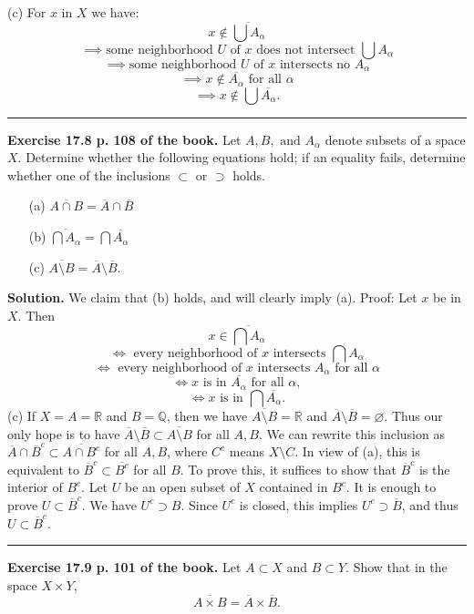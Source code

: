 \documentclass[12pt,letterpaper]{article}
\newcommand{\hs}{\bigskip\hrule\medskip}
\newcommand{\noi}{\noindent}%
\newcommand{\Q}{\mathbb Q}%
\newcommand{\sm}{\setminus}
\newcommand{\R}{\mathbb R}
\begin{document}
\noi(c) For $x$ in $X$ we have: 
$$
x\notin\overline{\bigcup A_\alpha}
$$ 
$$
\implies\text{some neighborhood $U$ of $x$ does not intersect }\bigcup A_\alpha
$$ 
$$
\implies\text{some neighborhood $U$ of $x$ intersects no }A_\alpha
$$ 
$$
\implies x\notin\overline{A_\alpha}\text{ for all }\alpha
$$ 
$$
\implies x\notin\bigcup\overline{A_\alpha}.
$$ 

\hs 

\noi\textbf{Exercise 17.8 p. 108 of the book.} Let $A, B, \text{ and } A_\alpha$ denote subsets of a space $X$. Determine whether the following equations hold; if an equality fails, determine whether one of the inclusions $\subset$ or $\supset$ holds.
\begin{enumerate}%
\item[(a)] $\overline{A \cap B}= \overline{A} \cap \overline{B}$
\item[(b)] $\overline{\bigcap A_\alpha}=\bigcap\overline{A_\alpha}$
\item[(c)] $\overline{A\sm B}=\overline{A}\sm\overline{B}$.
\end{enumerate}

\noi\textbf{Solution.} We claim that (b) holds, and will clearly imply (a). Proof: Let $x$ be in $X$. Then 
$$
x\in\overline{\bigcap A_\alpha}
$$ 
$$
\iff\text{ every neighborhood of $x$ intersects }\bigcap A_\alpha
$$ 
$$
\iff\text{ every neighborhood of $x$ intersects $A_\alpha$ for all $\alpha$}
$$ 
$$
\iff x\text{ is in }\overline{A_\alpha}\text{ for all }\alpha,
$$ 
$$
\iff x\text{ is in }\bigcap\overline{A_\alpha}.
$$ 
(c) If $X=A=\R$ and $B=\Q$, then we have $\overline{A\sm B}=\R$ and $\overline{A}\sm\overline{B}=\varnothing$. Thus our only hope is to have $\overline{A}\sm\overline{B}\subset\overline{A\sm B}$ for all $A,B$. We can rewrite this inclusion as $\overline{A}\cap\overline{B}^c\subset\overline{A\cap B^c}$ for all $A,B$, where $C^c$ means $X\sm C$. In view of (a), this is equivalent to $\overline{B}^c\subset\overline{B^c}$ for all $B$. To prove this, it suffices to show that $\overline{B}^c$ is the interior of $B^c$. Let $U$ be an open subset of $X$ contained in $B^c$. It is enough to prove $U\subset\overline{B}^c$. We have $U^c\supset B$. Since $U^c$ is closed, this implies $U^c\supset\overline B$, and thus $U\subset\overline{B}^c$. 

\hs

\noi\textbf{Exercise 17.9 p. 101 of the book.} Let $A \subset X$ and $B \subset Y$. Show that in the space $X\times Y$,
\[
\overline{A\times B}=\overline{A}\times\overline{B}.
\]
\end{document}
